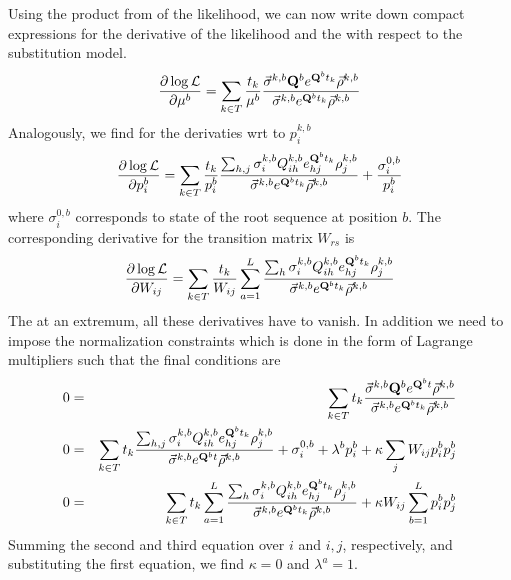 \documentclass[aps,rmp, onecolumn]{revtex4}
\newcommand{\mat}[1]{{\bf #1}}
\newcommand{\eqp}{p}
\newcommand{\LH}{\mathcal{L}}
\begin{document}
Using the product from of the likelihood, we can now write down compact expressions for the derivative of the likelihood and the with respect to the substitution model.
\begin{equation}
	\frac{\partial \log \LH}{\partial \mu^{b}} = \sum_{k\in T} \frac{t_k}{\mu^{b}}\frac{\vec{\sigma}^{k,b} \mat{Q}^{b} e^{\mat{Q}^{b}t_k} \vec{\rho}^{k,b}}{\vec{\sigma}^{k,b} e^{\mat{Q}^{b}t_k} \vec{\rho}^{k,b}}
\end{equation}
Analogously, we find for the derivaties wrt to $\eqp^{k,b}_{i}$
\begin{equation}
\frac{\partial \log \LH}{\partial \eqp^{b}_i}= \sum_{k\in T} \frac{t_k}{\eqp^{b}_i}\frac{\sum_{h,j}\sigma^{k,b}_i Q^{k,b}_{ih} e^{\mat{Q}^{b}t_k}_{hj} \rho^{k,b}_j}{\vec{\sigma}^{k,b} e^{\mat{Q}^{b}t_k} \vec{\rho}^{k,b}} + \frac{\sigma^{0,b}_i}{\eqp^b_i}
\end{equation}
where $\sigma^{0,b}_i$ corresponds to state of the root sequence at position $b$.
The corresponding derivative for the transition matrix $W_{rs}$ is
\begin{equation}
	\frac{\partial \log \LH}{\partial W_{ij}}= \sum_{k\in T} \frac{t_k}{W_{ij}} \sum_{a=1}^L\frac{\sum_{h}\sigma^{k,b}_i Q^{k,b}_{ih} e^{\mat{Q}^{b}t_k}_{hj} \rho^{k,b}_j}{\vec{\sigma}^{k,b} e^{\mat{Q}^{b}t_k} \vec{\rho}^{k,b}}
\end{equation}
The at an extremum, all these derivatives have to vanish.
In addition we need to impose the normalization constraints which is done in the form of Lagrange multipliers such that the final conditions are
\begin{eqnarray}
	0 &=& \sum_{k\in T} t_k\frac{\vec{\sigma}^{k,b} \mat{Q}^{b} e^{\mat{Q}^{b}t} \vec{\rho}^{k,b}}{\vec{\sigma}^{k,b} e^{\mat{Q}^{b}t_k} \vec{\rho}^{k,b}} \nonumber \\
    0 &=& 	\sum_{k\in T} t_k\frac{\sum_{h,j}\sigma^{k,b}_i Q^{k,b}_{ih} e^{\mat{Q}^{b}t_k}_{hj} \rho^{k,b}_j}{\vec{\sigma}^{k,b} e^{\mat{Q}^{b}t} \vec{\rho}^{k,b}} + \sigma^{0,b}_i + \lambda^{b}\eqp^b_i + \kappa \sum_j W_{ij}\eqp_i^{b}\eqp_j^{b} \nonumber\\
	0 &=& \sum_{k\in T} t_k \sum_{a=1}^L\frac{\sum_{h}\sigma^{k,b}_i Q^{k,b}_{ih} e^{\mat{Q}^{b}t_k}_{hj} \rho^{k,b}_j}{\vec{\sigma}^{k,b} e^{\mat{Q}^{b}t_k} \vec{\rho}^{k,b}} + \kappa W_{ij}\sum_{b=1}^L \eqp^b_i\eqp^b_j
\end{eqnarray}
Summing the second and third equation over $i$ and $i,j$, respectively, and substituting the first equation, we find $\kappa=0$ and $\lambda^a=1$.
\end{document}
